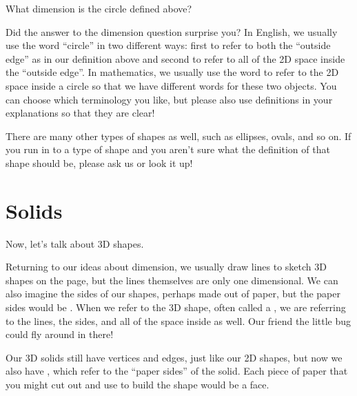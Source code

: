 \documentclass{ximera}
\begin{document}
\begin{question}
	What dimension is the circle defined above?
	\begin{prompt}
		\begin{multipleChoice}
		\end{multipleChoice}
	\end{prompt}
\end{question}
Did the answer to the dimension question surprise you? In English, we usually use the word ``circle'' in two different ways: first to refer to both the ``outside edge'' as in our definition above and second to refer to all of the 2D space inside the ``outside edge''. In mathematics, we usually use the word  to refer to the 2D space inside a circle so that we have different words for these two objects. You can choose which terminology you like, but please also use definitions in your explanations so that they are clear!

There are many other types of shapes as well, such as ellipses, ovals, and so on. If you run in to a type of shape and you aren't sure what the definition of that shape should be, please ask us or look it up!


\section{Solids}

Now, let's talk about 3D shapes.

Returning to our ideas about dimension, we usually draw lines to sketch 3D shapes on the page, but the lines themselves are only one dimensional. We can also imagine the sides of our shapes, perhaps made out of paper, but the paper sides would be . When we refer to the 3D shape, often called a , we are referring to the lines, the sides, and all of the space inside as well. Our friend the little bug could fly around in there!

Our 3D solids still have vertices and edges, just like our 2D shapes, but now we also have , which refer to the ``paper sides'' of the solid. Each piece of paper that you might cut out and use to build the shape would be a face.
\end{document}
